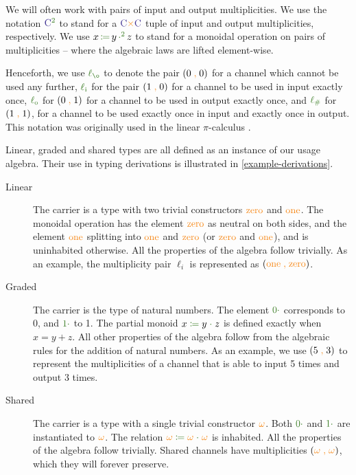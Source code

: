 \documentclass[a4paper,UKenglish,cleveref,autoref,thm-restate,authorcolumns]{lipics-v2019}
\theoremstyle{definition}
\newcommand{\picalc}{$\pi$-calculus}
\newcommand{\type}[1]{\textcolor{BlueViolet}{\operatorname{#1}}}
\newcommand{\constr}[1]{\textcolor{BurntOrange}{\operatorname{#1}}}
\newcommand{\func}[1]{\textcolor{OliveGreen}{\operatorname{#1}}}
\newcommand{\comma}{\; \constr{,} \;}
\newcommand{\op}[3]{#1 \; \func{\coloneqq} \; #2 \; \func{\cdot} \; #3}
\newcommand{\opsquared}[3]{#1 \, \func{\coloneqq} \, #2 \, \func{\cdot^2} \, #3}
\newcommand{\zero}{\func{0\cdot}}
\newcommand{\one}{\func{1\cdot}}
\newcommand{\li}{\func{\ell_i}}
\newcommand{\lo}{\func{\ell_o}}
\newcommand{\lz}{\func{\ell_{\o}}}
\newcommand{\lio}{\func{\ell_{\#}}}
\begin{document}
\begin{note}
  \label{note:linearity}
  We will often work with pairs of input and output multiplicities.
  We use the notation $\type{C}^{\func{2}}$ to stand for a $\type{C} \constr{\times} \type{C}$ tuple of input and output multiplicities, respectively.
  We use $\opsquared{x}{y}{z}$ to stand for a monoidal operation on pairs of multiplicities -- where the algebraic laws are lifted element-wise.

  Henceforth, we use $\lz$ to denote the pair $(0 \comma 0)$ for a channel which cannot be used any further, $\li$ for the pair $(1 \comma 0)$ for a channel to be used in input exactly once, $\lo$ for $(0 \comma 1)$ for a channel to be used in output exactly once, and $\lio$ for $(1 \comma 1)$, for a channel to be used exactly once in input and exactly once in output.
  This notation was originally used in the linear \picalc{} \cite{KPT96,Sangio01}.
\end{note}

Linear, graded and shared types are all defined as an instance of our usage algebra.
Their use in typing derivations is illustrated in \autoref{example-derivations}.
\begin{description}
  \item [Linear]
    The carrier is a type with two trivial constructors $\constr{zero}$ and $\constr{one}$.
    The monoidal operation has the element $\constr{zero}$ as neutral on both sides, and the element $\constr{one}$ splitting into $\constr{one}$ and $\constr{zero}$ (or $\constr{zero}$ and $\constr{one}$), and is uninhabited otherwise.
    All the properties of the algebra follow trivially.
    As an example, the multiplicity pair $\ell_i$ is represented as $(\constr{one} \comma \constr{zero})$.

    \item [Graded]
    The carrier is the type of natural numbers.
    The element $\zero$ corresponds to 0, and $\one$ to 1.
    The partial monoid $\op{x}{y}{z}$ is defined exactly when $x = y + z$.
    All other properties of the algebra follow from the algebraic rules for the addition of natural numbers.
    As an example, we use $(5 \comma 3)$ to represent the multiplicities of a channel that is able to input 5 times and output 3 times.

    \item [Shared]
    The carrier is a type with a single trivial constructor $\constr{\omega}$.
    Both $\zero$ and $\one$ are instantiated to $\constr{\omega}$.
    The relation $\op{\constr{\omega}}{\constr{\omega}}{\constr{\omega}}$ is inhabited.
    All the properties of the algebra follow trivially.
    Shared channels have multiplicities $(\constr{\omega} \comma \constr{\omega})$, which they will forever preserve.
\end{description}
\end{document}
